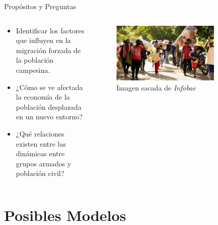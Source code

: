 \documentclass[17pt, t, lualatex]{beamer}
\begin{document}
\insertsectionpage

\begin{frame}{Propósitos y Preguntas}

  \begin{columns}
    \begin{column}{0.5\textwidth}
      \begin{itemize}
        \item Identificar los factores que influyen en la migración forzada de la población campesina. 
        \item ¿Cómo se ve afectada la economía de la población desplazada en un nuevo entorno?
        \item ¿Qué relaciones existen entre las dinámicas entre grupos armados y población civil?
      \end{itemize}
    \end{column}

    \begin{column}{0.5\textwidth}
  \begin{figure}[ht]
    \centering
    \includegraphics[width=0.8\textwidth]{img/equis.jpg}
    \caption{Imagen sacada de \textit{Infobae}\cite{infobae}}
    \label{fig:7}
  \end{figure}
    \end{column}
  \end{columns}

\end{frame}

\section{Posibles Modelos}

\insertsectionpage
\end{document}
